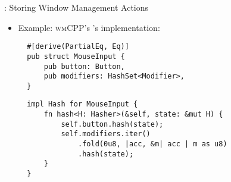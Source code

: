 \begin{frame}[fragile]{\underline{\cpp}: Storing Window Management Actions \hfill {\footnotesize \currentname}}


    \begin{itemize}

        \item Example: \textsc{wmCPP}'s 's  implementation:\\[3pt] 
\begin{verbatim}
  #[derive(PartialEq, Eq)]
  pub struct MouseInput {
      pub button: Button,
      pub modifiers: HashSet<Modifier>,
  }
\end{verbatim}
\begin{verbatim}
  impl Hash for MouseInput {
      fn hash<H: Hasher>(&self, state: &mut H) {
          self.button.hash(state);
          self.modifiers.iter()
              .fold(0u8, |acc, &m| acc | m as u8)
              .hash(state);
      }
  }
\end{verbatim}

    \end{itemize}

    \vfill

\end{frame}

